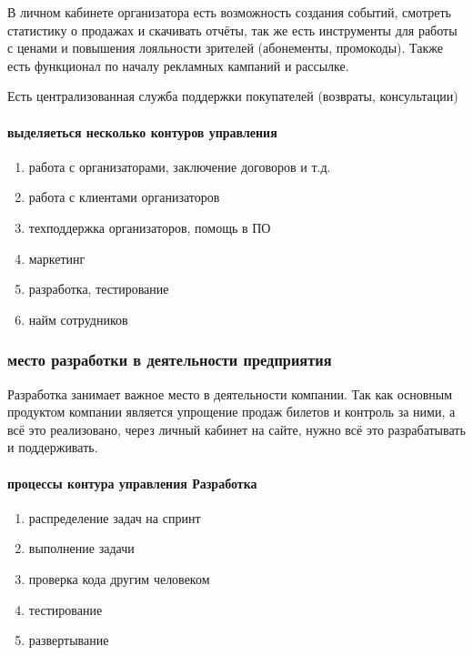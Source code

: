 \documentclass{article}
\begin{document}
В личном кабинете организатора есть возможность создания событий,
смотреть статистику о продажах и скачивать отчёты, так же есть
инструменты для работы с ценами и повышения лояльности зрителей (абонементы, промокоды).
Также есть функционал по началу рекламных кампаний и рассылке.

Есть централизованная служба поддержки покупателей (возвраты, консультации)

\paragraph{выделяеться несколько контуров управления}
\begin{enumerate}
    \item{работа с организаторами, заключение договоров и т.д.}
    \item{работа с клиентами организаторов}
    \item{техподдержка организаторов, помощь в ПО}
    \item{маркетинг}
    \item{разработка, тестирование}
    \item{найм сотрудников}
\end{enumerate}

\subsubsection{место разработки в деятельности предприятия}

Разработка занимает важное место в деятельности компании.
Так как основным продуктом компании является упрощение продаж билетов и контроль
за ними, а всё это реализовано, через личный кабинет на сайте, нужно всё это разрабатывать
и поддерживать.

\paragraph{процессы контура управления Разработка}
\begin{enumerate}
    \item{распределение задач на спринт}
    \item{выполнение задачи}
    \item{проверка кода другим человеком}
    \item{тестирование}
    \item{развертывание}
\end{enumerate}
\end{document}
